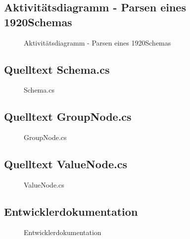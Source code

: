 \subsection{Aktivitätsdiagramm - Parsen eines 1920Schemas}
\label{app:AktivitaetsdiagrammSchemaParsen}
\begin{figure}[htb]
\centering
{}
\caption{Aktivitätsdiagramm - Parsen eines 1920Schemas}
\end{figure}
\clearpage






\subsection{Quelltext Schema.cs}
\label{app:SchemaSrc}
\begin{figure}[htb]
\centering
{}
\caption{Schema.cs}
\end{figure}
\clearpage




\subsection{Quelltext GroupNode.cs}
\label{app:GroupNodeSrc}
\begin{figure}[htb]
\centering
{}
\caption{GroupNode.cs}
\end{figure}
\clearpage


\subsection{Quelltext ValueNode.cs}
\label{app:ValueNodeSrc}
\begin{figure}[htb]
\centering
{}
\caption{ValueNode.cs}
\end{figure}
\clearpage


\subsection{Entwicklerdokumentation}
\label{app:Entwicklerdokumentation}
\begin{figure}[htb]
\centering
{}
\caption{Entwicklerdokumentation}
\end{figure}
\clearpage
